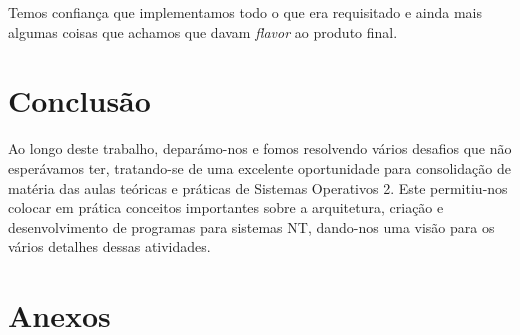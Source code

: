 \documentclass[11pt]{article}
\begin{document}
    Temos confiança que implementamos todo o que era requisitado e ainda mais algumas coisas que achamos que davam \textit{flavor} ao produto final.
    
	\large
	\section{Conclusão}
	\normalsize
	
	Ao longo deste trabalho, deparámo-nos e fomos resolvendo vários desafios que não esperávamos ter, tratando-se de uma excelente oportunidade para consolidação de matéria das aulas teóricas e práticas de Sistemas Operativos 2. Este permitiu-nos colocar em prática conceitos importantes sobre a arquitetura, criação e desenvolvimento de programas para sistemas NT, dando-nos uma visão para os vários detalhes dessas atividades.
	
	\pagebreak
	
	
	\large
	\section{Anexos}
	\normalsize
	
	\listoffigures
	\lstlistoflistings
\end{document}
